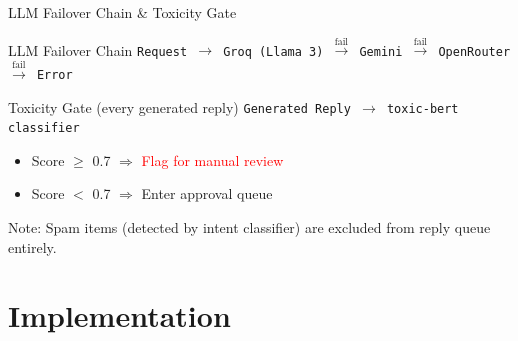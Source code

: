 \documentclass[aspectratio=169]{beamer}
\begin{document}
\begin{frame}{LLM Failover Chain \& Toxicity Gate}
  \begin{block}{LLM Failover Chain}
    \centering
    \texttt{Request $\rightarrow$ Groq (Llama 3) $\xrightarrow{\text{fail}}$ Gemini $\xrightarrow{\text{fail}}$ OpenRouter $\xrightarrow{\text{fail}}$ Error}
  \end{block}
  \vspace{0.4cm}
  \begin{block}{Toxicity Gate (every generated reply)}
    \centering
    \texttt{Generated Reply $\rightarrow$ toxic-bert classifier}\\
    \vspace{0.2cm}
    \begin{itemize}
      \item Score $\geq$ 0.7 $\Rightarrow$ \textcolor{red}{Flag for manual review}
      \item Score $<$ 0.7 $\Rightarrow$ \textcolor{green!60!black}{Enter approval queue}
    \end{itemize}
  \end{block}
  \vspace{0.2cm}
  \small Note: Spam items (detected by intent classifier) are excluded from reply queue entirely.
\end{frame}

\section{Implementation}
\end{document}
